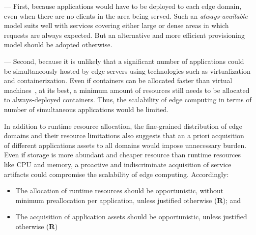 --- First, because applications would have to be deployed to each edge domain, even when there are no clients in the area being served. Such an \textit{always-available} model suits well with services covering either large or dense areas in which requests are always expected. But an alternative and more efficient provisioning model should be adopted otherwise.

--- Second, because it is unlikely that a significant number of applications could be simultaneously hosted by edge servers using technologies such as virtualization and containerization. Even if containers can be allocated faster than virtual machines~\cite{Quatrocchi2016discrete}, at its best, a minimum amount of resources still needs to be allocated to always-deployed containers. Thus, the scalability of edge computing in terms of number of simultaneous applications would be limited. 
	
In addition to runtime resource allocation, the fine-grained distribution of edge domains and their resource limitations also suggests that an a priori acquisition of different applications assets to all domains would impose unnecessary burden. Even if storage is more abundant and cheaper resource than runtime resources like CPU and memory, a proactive and indiscriminate acquisition of service artifacts could compromise the scalability of edge computing. Accordingly:

\begin{itemize}

	\item The allocation of runtime resources should be opportunistic, without minimum preallocation per application, unless justified otherwise (\textbf{R}); and
	
	\item The acquisition of application assets should be opportunistic, unless justified otherwise (\textbf{R})

\end{itemize} 

